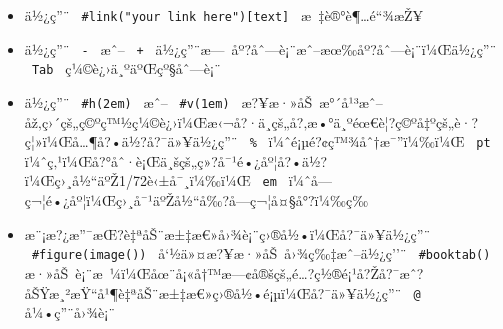 \begin{itemize}
\begin{Shaded}
\begin{Highlighting}[]
\end{Highlighting}
\end{Shaded}
\item
  ä½¿ç''¨ \texttt{\ \#link("your\ link\ here"){[}text{]}\ }
  æ~‡è®°è¶\ldots é``¾æŽ¥

\begin{Shaded}
\begin{Highlighting}[]
\end{Highlighting}
\end{Shaded}
\item
  ä½¿ç''¨ \texttt{\ -\ } æˆ-- \texttt{\ +\ }
  ä½¿ç''¨æ---~åº?åˆ---è¡¨æˆ--æœ‰åº?åˆ---è¡¨ï¼Œä½¿ç''¨ \texttt{\ Tab\ }
  ç¼©è¿›ä¸ºäºŒçº§åˆ---è¡¨

\begin{Shaded}
\begin{Highlighting}[]
\end{Highlighting}
\end{Shaded}
\item
  ä½¿ç''¨ \texttt{\ \#h(2em)\ } æˆ-- \texttt{\ \#v(1em)\ }
  æ?¥æ·»åŠ~æ°´å¹³æˆ--åž‚ç›´çš„ç©ºç™½ç¼©è¿›ï¼Œæ‹¬å?·ä¸­çš„å?‚æ•°ä¸ºéœ€è¦?ç©ºå‡ºçš„è·?ç¦»ï¼Œå\ldots¶å?•ä½?å?¯ä»¥ä½¿ç''¨
  \texttt{\ \%\ } ï¼ˆé¡µé?¢ç™¾åˆ†æ¯''ï¼‰ï¼Œ \texttt{\ pt\ }
  ï¼ˆç‚¹ï¼Œå?°åˆ·è¡Œä¸šçš„ç»?å¯¹é•¿åº¦å?•ä½?ï¼Œç›¸å½``äºŽ1/72è‹±å¯¸ï¼‰ï¼Œ
  \texttt{\ em\ } ï¼ˆå­---ç¬¦é•¿åº¦ï¼Œç›¸å¯¹äºŽå½``å‰?å­---ç¬¦å¤§å°?ï¼‰ç­‰

\begin{Shaded}
\begin{Highlighting}[]
\end{Highlighting}
\end{Shaded}
\item
  æ¨¡æ?¿æ''¯æŒ?è‡ªåŠ¨æ±‡æ€»å›¾è¡¨ç›®å½•ï¼Œå?¯ä»¥ä½¿ç''¨
  \texttt{\ \#figure(image())\ } å`½ä»¤æ?¥æ·»åŠ~å›¾ç‰‡æˆ--ä½¿ç''¨
  \texttt{\ \#booktab()\ }
  æ·»åŠ~è¡¨æ~¼ï¼Œåœ¨å¡«å†™æ---¢å®šçš„é\ldots?ç½®é¡¹å?Žå?¯æˆ?åŠŸæ¸²æŸ``å¹¶è‡ªåŠ¨æ±‡æ€»ç›®å½•é¡µï¼Œå?¯ä»¥ä½¿ç''¨
  \texttt{\ @\ } å¼•ç''¨å›¾è¡¨

\begin{Shaded}
\begin{Highlighting}[]


\end{Highlighting}
\end{Shaded}
\end{itemize}
